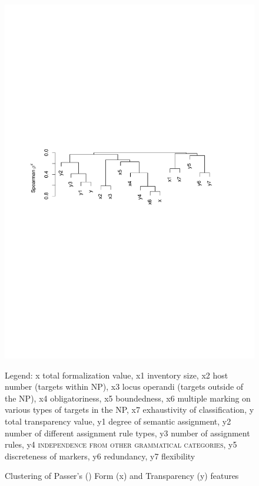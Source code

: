 \documentclass[output=collectionpaper]{langsci/langscibook}
\begin{document}
\begin{figure}
\caption{Clustering of Passer's (\citeyear{Passer2016b}) Form (x) and Transparency (y) features}
\includegraphics[width=\textwidth]{figures/14/fig4}
\begin{flushleft}
  \small Legend: x total formalization value, x1 inventory size, x2 host number (targets within NP), x3 locus operandi (targets outside of the NP), x4 obligatoriness, x5 boundedness, x6 multiple marking on various types of targets in the NP, x7 exhaustivity of classification, y total transparency value, y1 degree of semantic assignment, y2 number of different assignment rule types, y3 number of assignment rules, y4 \textsc{independence from other grammatical categories}, y5 discreteness of markers, y6 redundancy, y7 flexibility
\end{flushleft}%
\label{fig:WDG:4}
\end{figure}
\end{document}
